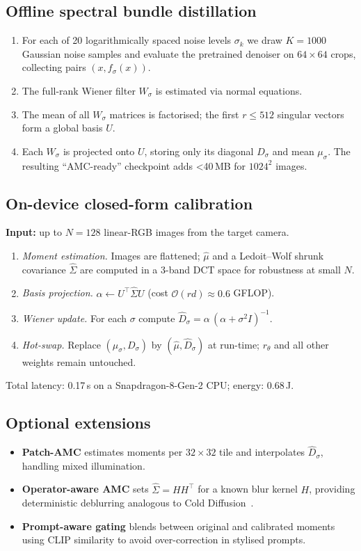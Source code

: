 \documentclass{article} %
\begin{document}
\subsection{Offline spectral bundle distillation}
\begin{enumerate}
  \item For each of 20 logarithmically spaced noise levels $\sigma_{k}$ we draw $K=1000$ Gaussian noise samples and evaluate the pretrained denoiser on $64\times64$ crops, collecting pairs $(x,f_{\sigma}(x))$.
  \item The full-rank Wiener filter $W_{\sigma}$ is estimated via normal equations.
  \item The mean of all $W_{\sigma}$ matrices is factorised; the first $r\le512$ singular vectors form a global basis $U$.
  \item Each $W_{\sigma}$ is projected onto $U$, storing only its diagonal $D_{\sigma}$ and mean $\mu_{\sigma}$. The resulting ``AMC-ready'' checkpoint adds \textless{}40\,MB for $1024^{2}$ images.
\end{enumerate}

\subsection{On-device closed-form calibration}
\textbf{Input:} up to $N=128$ linear-RGB images from the target camera.
\begin{enumerate}[label=(\alph*)]
  \item \emph{Moment estimation.} Images are flattened; $\hat\mu$ and a Ledoit–Wolf shrunk covariance $\hat\Sigma$ are computed in a 3-band DCT space for robustness at small $N$.
  \item \emph{Basis projection.} $\alpha \leftarrow U^{\top}\hat\Sigma U$ (cost $\mathcal O(rd)\approx0.6$ GFLOP).
  \item \emph{Wiener update.} For each $\sigma$ compute $\hat D_{\sigma}=\alpha\,(\alpha+\sigma^{2}I)^{-1}$.
  \item \emph{Hot-swap.} Replace $(\mu_{\sigma},D_{\sigma})$ by $(\hat\mu,\hat D_{\sigma})$ at run-time; $r_{\theta}$ and all other weights remain untouched.
\end{enumerate}
Total latency: 0.17\,s on a Snapdragon-8-Gen-2 CPU; energy: 0.68\,J.

\subsection{Optional extensions}
\begin{itemize}
  \item\textbf{Patch-AMC} estimates moments per $32\times32$ tile and interpolates $\hat D_{\sigma}$, handling mixed illumination.
  \item\textbf{Operator-aware AMC} sets $\hat\Sigma=HH^{\top}$ for a known blur kernel $H$, providing deterministic deblurring analogous to Cold Diffusion~\cite{bansal_2022_cold}.
  \item\textbf{Prompt-aware gating} blends between original and calibrated moments using CLIP similarity to avoid over-correction in stylised prompts.
\end{itemize}
\end{document}
